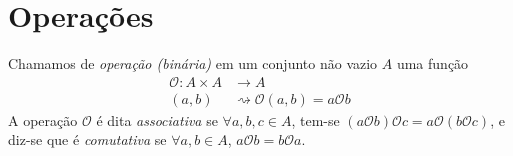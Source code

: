 \section{Operações}
\begin{df}
Chamamos de \emph{operação (binária)} em um conjunto não vazio $A$ uma função
\begin{align*}
\mathcal{O}: A \times A &\rightarrow A \\
(a,b) &\rightsquigarrow \mathcal{O}(a,b)=a\mathcal{O}b
\end{align*}
A operação $\mathcal{O}$ é dita \emph{associativa} se $\forall a,b,c \in A$, tem-se $(a\mathcal{O}b)\mathcal{O}c=a\mathcal{O}(b\mathcal{O}c)$, e diz-se que é \emph{comutativa} se $\forall a,b \in A$, $a\mathcal{O}b=b\mathcal{O}a$.
\end{df}
